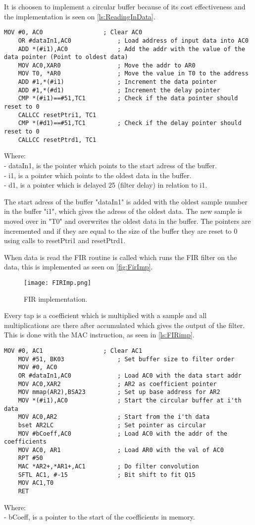 It is choosen to implement a circular buffer because of its cost effectiveness and the implementation is seen on \autoref{ls:ReadingInData}.
\begin{lstlisting}[language={[x86masm]Assembler}, caption = {Reading data in},label={ls:ReadingInData}]
	MOV #0, AC0					; Clear AC0
	OR #dataIn1,AC0				; Load address of input data into AC0
	ADD *(#i1),AC0				; Add the addr with the value of the data pointer (Point to oldest data)
	MOV AC0,XAR0				; Move the addr to AR0
	MOV T0, *AR0				; Move the value in T0 to the address
	ADD #1,*(#i1)				; Increment the data pointer
	ADD #1,*(#d1)				; Increment the delay pointer
	CMP *(#i1)==#51,TC1			; Check if the data pointer should reset to 0
	CALLCC resetPtri1, TC1
	CMP *(#d1)==#51,TC1			; Check if the delay pointer should reset to 0
	CALLCC resetPtrd1, TC1
\end{lstlisting}
Where: \\
- dataIn1, is the pointer which points to the start adress of the buffer. \\
- i1, is a pointer which points to the oldest data in the buffer. \\
- d1, is a pointer which is delayed 25 (filter delay) in relation to i1. 

The start adress of the buffer "dataIn1" is added with the oldest sample number in the buffer "i1", which gives the adress of the oldest data. The new sample is moved over in "T0" and overwrites the oldest data in the buffer. The pointers are incremented and if they are equal to the size of the buffer they are reset to 0 using calls to resetPtri1 and resetPtrd1.

When data is read the FIR routine is called which runs the FIR filter on the data, this is implemented as seen on \autoref{fig:FirImp}.
\begin{figure}[H]
\centering
\texttt{[image: FIRImp.png]}
\caption{FIR implementation.}
\label{fig:FirImp}
\end{figure}
Every tap is a coefficient which is multiplied with a sample and all multiplications are there after accumulated which gives the output of the filter. This is done with the MAC instruction, as seen in \autoref{ls:FIRimp}.
\begin{lstlisting}[language={[x86masm]Assembler}, caption = {FIR algorithm.},label={ls:FIRimp}]
	MOV #0, AC1					; Clear AC1
	MOV #51, BK03				; Set buffer size to filter order
	MOV #0, AC0
	OR #dataIn1,AC0				; Load AC0 with the data start addr
	MOV AC0,XAR2				; AR2 as coefficient pointer
	MOV mmap(AR2),BSA23        	; Set up base address for AR2
	MOV *(#i1),AC0				; Start the circular buffer at i'th data
	MOV AC0,AR2					; Start from the i'th data
	bset AR2LC					; Set pointer as circular
	MOV #bCoeff,AC0				; Load AC0 with the addr of the coefficients
	MOV AC0, AR1				; Load AR0 with the val of AC0
	RPT #50						
	MAC *AR2+,*AR1+,AC1 		; Do filter convolution
	SFTL AC1, #-15				; Bit shift to fit Q15
	MOV AC1,T0     				
	RET
\end{lstlisting}
Where: \\
- bCoeff, is a pointer to the start of the coefficients in memory. 

